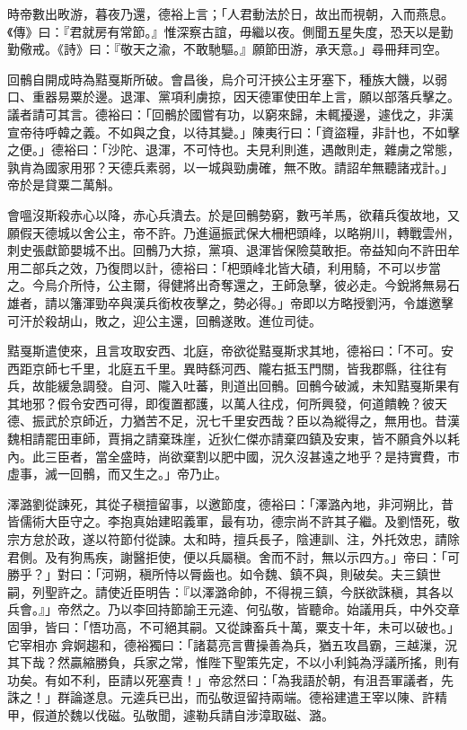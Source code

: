 \begin{pinyinscope}
 時帝數出畋游，暮夜乃還，德裕上言；「人君動法於日，故出而視朝，入而燕息。《傳》曰：『君就房有常節。』惟深察古誼，毋繼以夜。側聞五星失度，恐天以是勤勤儆戒。《詩》曰：『敬天之渝，不敢馳驅。』願節田游，承天意。」尋冊拜司空。



 回鶻自開成時為黠戛斯所破。會昌後，烏介可汗挾公主牙塞下，種族大饑，以弱口、重器易粟於邊。退渾、黨項利虜掠，因天德軍使田牟上言，願以部落兵擊之。議者請可其言。德裕曰：「回鶻於國嘗有功，以窮來歸，未輒擾邊，遽伐之，非漢宣帝待呼韓之義。不如與之食，以待其變。」陳夷行曰：「資盜糧，非計也，不如擊之便。」德裕曰：「沙陀、退渾，不可恃也。夫見利則進，遇敵則走，雜虜之常態，孰肯為國家用邪？天德兵素弱，以一城與勁虜確，無不敗。請詔牟無聽諸戎計。」帝於是貸粟二萬斛。



 會嗢沒斯殺赤心以降，赤心兵潰去。於是回鶻勢窮，數丐羊馬，欲藉兵復故地，又願假天德城以舍公主，帝不許。乃進逼振武保大柵杷頭峰，以略朔川，轉戰雲州，刺史張獻節嬰城不出。回鶻乃大掠，黨項、退渾皆保險莫敢拒。帝益知向不許田牟用二部兵之效，乃復問以計，德裕曰：「杷頭峰北皆大磧，利用騎，不可以步當之。今烏介所恃，公主爾，得健將出奇奪還之，王師急擊，彼必走。今銳將無易石雄者，請以籓渾勁卒與漢兵銜枚夜擊之，勢必得。」帝即以方略授劉沔，令雄邀擊可汗於殺胡山，敗之，迎公主還，回鶻遂敗。進位司徒。



 黠戛斯遣使來，且言攻取安西、北庭，帝欲從黠戛斯求其地，德裕曰：「不可。安西距京師七千里，北庭五千里。異時繇河西、隴右抵玉門關，皆我郡縣，往往有兵，故能緩急調發。自河、隴入吐蕃，則道出回鶻。回鶻今破滅，未知黠戛斯果有其地邪？假令安西可得，即復置都護，以萬人往戍，何所興發，何道饋輓？彼天德、振武於京師近，力猶苦不足，況七千里安西哉？臣以為縱得之，無用也。昔漢魏相請罷田車師，賈捐之請棄珠崖，近狄仁傑亦請棄四鎮及安東，皆不願貪外以耗內。此三臣者，當全盛時，尚欲棄割以肥中國，況久沒甚遠之地乎？是持實費，市虛事，滅一回鶻，而又生之。」帝乃止。



 澤潞劉從諫死，其從子稹擅留事，以邀節度，德裕曰：「澤潞內地，非河朔比，昔皆儒術大臣守之。李抱真始建昭義軍，最有功，德宗尚不許其子繼。及劉悟死，敬宗方怠於政，遂以符節付從諫。太和時，擅兵長子，陰連訓、注，外托效忠，請除君側。及有狗馬疾，謝醫拒使，便以兵屬稹。舍而不討，無以示四方。」帝曰：「可勝乎？」對曰：「河朔，稹所恃以脣齒也。如令魏、鎮不與，則破矣。夫三鎮世嗣，列聖許之。請使近臣明告：『以澤潞命帥，不得視三鎮，今朕欲誅稹，其各以兵會。』」帝然之。乃以李回持節諭王元逵、何弘敬，皆聽命。始議用兵，中外交章固爭，皆曰：「悟功高，不可絕其嗣。又從諫畜兵十萬，粟支十年，未可以破也。」它宰相亦弇婀趨和，德裕獨曰：「諸葛亮言曹操善為兵，猶五攻昌霸，三越漅，況其下哉？然贏縮勝負，兵家之常，惟陛下聖策先定，不以小利鈍為浮議所搖，則有功矣。有如不利，臣請以死塞責！」帝忿然曰：「為我語於朝，有沮吾軍議者，先誅之！」群論遂息。元逵兵已出，而弘敬逗留持兩端。德裕建遣王宰以陳、許精甲，假道於魏以伐磁。弘敬聞，遽勒兵請自涉漳取磁、潞。




\end{pinyinscope}
